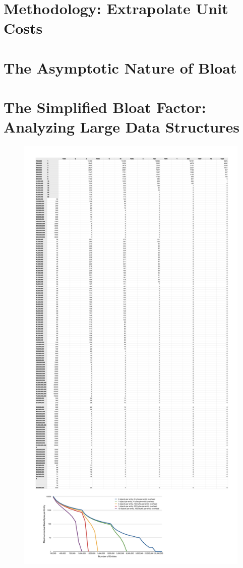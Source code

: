 \section{Methodology: Extrapolate Unit Costs}

\section{The Asymptotic Nature of Bloat}

\section{The Simplified Bloat Factor: Analyzing Large Data Structures}


\begin{figure}
\centering
	\includegraphics[width=\textwidth]{part3/Figures/assessing/maxActualData}

\end{figure}
